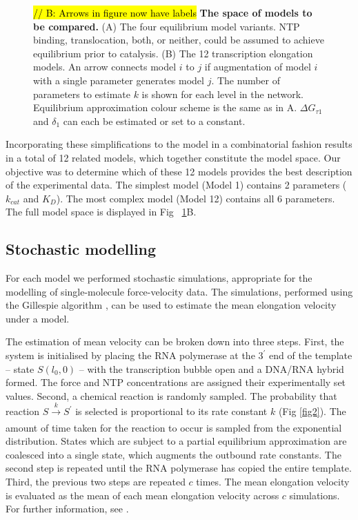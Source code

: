 \documentclass[10pt,letterpaper]{article}
\begin{document}
\begin{figure}[!h]
\caption{\hl{// B: Arrows in figure now have labels } \textbf{ The space of models to be compared.} (A) The four equilibrium model variants. NTP binding, translocation, both, or neither, could be assumed to achieve equilibrium prior to catalysis. (B) The 12 transcription elongation models. An arrow connects model $i$ to $j$ if augmentation of model $i$ with a single parameter generates model $j$. The number of parameters to estimate  $k$ is shown for each level in the network. Equilibrium approximation colour scheme is the same as in A. $\Delta G_{\tau 1}$ and $\delta_1$ can each be estimated or set to a constant.}
\label{fig4}
\end{figure}



Incorporating these simplifications to the model in a combinatorial fashion results in a total of 12 related models, which together constitute the model space. Our objective was to determine which of these 12 models provides the best description of the experimental data. The simplest model (Model 1) contains 2 parameters ($k_{cat}$ and $K_D$). The most complex model (Model 12) contains all 6 parameters. The full model space is displayed in Fig ~\ref{fig4}B.






\subsection*{Stochastic modelling}


For each model we performed stochastic simulations, appropriate for the modelling of single-molecule force-velocity data. The simulations, performed using the Gillespie algorithm \cite{gillespie1977exact, lecca2013stochastic}, can be used to estimate the mean elongation velocity under a model.



The estimation of mean velocity can be broken down into three steps. First, the system is initialised by placing the RNA polymerase at the $3^\prime$ end of the template -- state $S(l_0, 0)$ -- with the transcription bubble open and a DNA/RNA hybrid formed. The force and NTP concentrations are assigned their experimentally set values. Second, a chemical reaction is randomly sampled. The probability that reaction $S \xrightarrow[]{k} S^\prime$ is selected is proportional to its rate constant $k$ (Fig \ref{fig2}).  The amount of time taken for the reaction to occur is sampled from the exponential distribution. States which are subject to a partial equilibrium approximation are coalesced into a single state, which augments the outbound rate constants. The second step is repeated until the RNA polymerase has copied the entire template. Third, the previous two steps are repeated $c$ times. The mean elongation velocity is evaluated as the mean of each mean elongation velocity across $c$ simulations. For further information, see .\\
\end{document}
